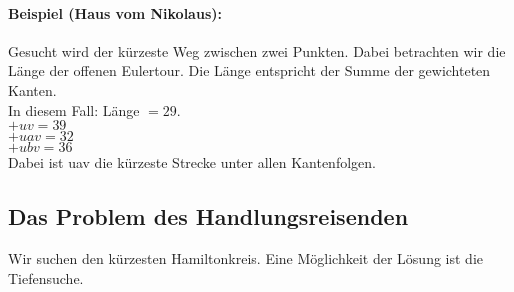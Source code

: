 \paragraph{Beispiel (Haus vom Nikolaus):} Gesucht wird der kürzeste Weg zwischen zwei Punkten. Dabei betrachten wir die Länge der offenen Eulertour. Die Länge entspricht der Summe der gewichteten Kanten.\\
In diesem Fall: Länge $= 29$. \\
$+uv=39$\\
$+uav=32$\\
$+ubv=36$\\
Dabei ist uav die kürzeste Strecke unter allen Kantenfolgen. 



 

\subsection{Das Problem des Handlungsreisenden}
Wir suchen den kürzesten Hamiltonkreis. Eine Möglichkeit der Lösung ist die Tiefensuche. 
